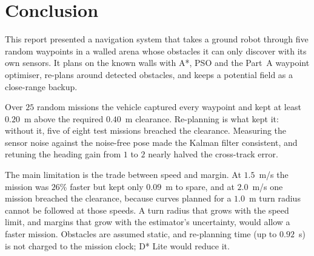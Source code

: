 \section{Conclusion}
\label{sec:conclusion}

This report presented a navigation system that takes a ground robot
through five random waypoints in a walled arena whose obstacles it can
only discover with its own sensors. It plans on the known walls
with A*, PSO and the Part~A waypoint optimiser, re-plans around detected
obstacles, and keeps a potential field as a close-range backup.

Over $25$ random missions the vehicle captured every waypoint and kept
at least $0.20$~m above the required $0.40$~m clearance. Re-planning
is what kept it: without it, five of eight test missions breached the
clearance. Measuring the sensor noise against the noise-free pose made
the Kalman filter consistent, and retuning the heading gain from $1$ to
$2$ nearly halved the cross-track error.

The main limitation is the trade between speed and margin. At
$1.5$~m/s the mission was $26$\% faster but kept only $0.09$~m to
spare, and at $2.0$~m/s one mission breached the clearance, because
curves planned for a $1.0$~m turn radius cannot be followed at those
speeds. A turn radius that grows with the speed limit, and margins that
grow with the estimator's uncertainty, would allow a faster mission.
Obstacles are assumed static, and re-planning time (up to $0.92$~s)
is not charged to the mission clock; D* Lite
would reduce it.

